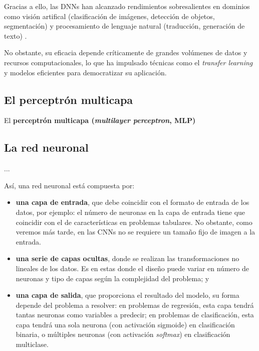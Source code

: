 Gracias a ello, las DNNs han alcanzado rendimientos sobresalientes en dominios como visión artifical
(clasificación de imágenes, detección de objetos, segmentación) y procesamiento de lenguaje natural 
(traducción, generación de texto) \cite{redhat2024DeepLearningDefinition}.

No obstante, su eficacia depende críticamente de grandes volúmenes de datos y recursos computacionales,
lo que ha impulsado técnicas como el \textit{transfer learning} y modelos eficientes para democratizar 
su aplicación.


\subsection{El perceptrón multicapa}

El \textbf{perceptrón multicapa (\textit{multilayer perceptron}, MLP)}



\subsection{La red neuronal}



...

Así, una red neuronal está compuesta por: 

\begin{itemize}

    \item \textbf{una capa de entrada}, que debe coincidir con el formato de entrada de los datos, por ejemplo: el
    número de neuronas en la capa de entrada tiene que coincidir con el de características en problemas tabulares.
    No obstante, como veremos más tarde, en las CNNs no se requiere un tamaño fijo de imagen a la entrada.
    
    \item \textbf{una serie de capas ocultas}, donde se realizan las transformaciones no lineales de los datos. 
    Es en estas donde el diseño puede variar en número de neuronas y tipo de capas según la complejidad del 
    problema; y
    
    \item \textbf{una capa de salida}, que proporciona el resultado del modelo, su forma depende del problema a 
    resolver: en problemas de regresión, esta capa tendrá tantas neuronas como variables a predecir; en problemas de 
    clasificación, esta capa tendrá una sola neurona (con activación sigmoide) en clasificación binaria, o múltiples 
    neuronas (con activación \textit{softmax}) en clasificación multiclase.

\end{itemize}


